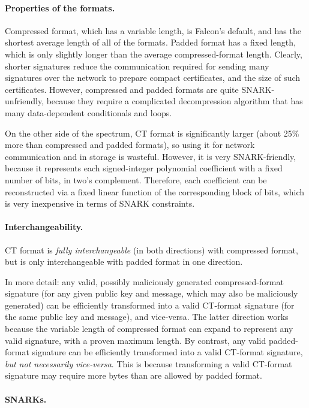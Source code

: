 \documentclass[11pt]{article}
\begin{document}
\paragraph{Properties of the formats.}

Compressed format, which has a variable length, is Falcon's default,
and has the shortest average length of all of the formats. Padded
format has a fixed length, which is only slightly longer than the
average compressed-format length. Clearly, shorter signatures reduce
the communication required for sending many signatures over the
network to prepare compact certificates, and the size of such
certificates. However, compressed and padded formats are quite
SNARK-unfriendly, because they require a complicated decompression
algorithm that has many data-dependent conditionals and loops.

On the other side of the spectrum, CT format is significantly larger
(about 25\% more than compressed and padded formats), so using it for
network communication and in storage is wasteful. However, it is very
SNARK-friendly, because it represents each signed-integer polynomial
coefficient with a fixed number of bits, in two's
complement. Therefore, each coefficient can be reconstructed via a
fixed linear function of the corresponding block of bits, which is
very inexpensive in terms of SNARK constraints.

\paragraph{Interchangeability.}

CT format is \emph{fully interchangeable} (in both directions) with
compressed format, but is only interchangeable with padded format in
one direction.

In more detail: any valid, possibly maliciously generated
compressed-format signature (for any given public key and message,
which may also be maliciously generated) can be efficiently
transformed into a valid CT-format signature (for the same public key
and message), and vice-versa. The latter direction works because the
variable length of compressed format can expand to represent any valid
signature, with a proven maximum length. By contrast, any valid
padded-format signature can be efficiently transformed into a valid
CT-format signature, \emph{but not necessarily vice-versa}. This is
because transforming a valid CT-format signature may require more
bytes than are allowed by padded format.

\paragraph{SNARKs.}
\end{document}
